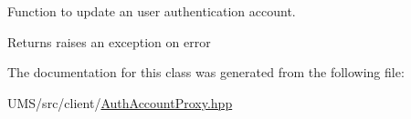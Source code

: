 Function to update an user authentication account. 

\begin{DoxyReturn}{Returns}
raises an exception on error 
\end{DoxyReturn}


The documentation for this class was generated from the following file:\begin{DoxyCompactItemize}
\item 
UMS/src/client/\hyperlink{AuthAccountProxy_8hpp}{AuthAccountProxy.hpp}\end{DoxyCompactItemize}
